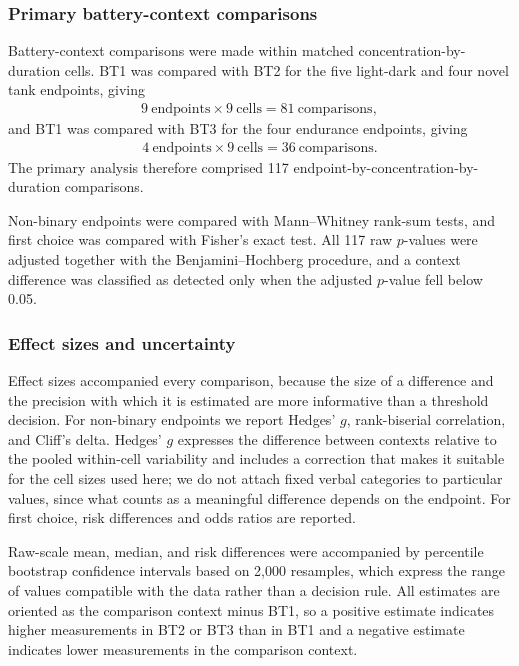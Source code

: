 \documentclass[12pt,a4paper]{article}
\begin{document}
\subsubsection{Primary battery-context comparisons}
\label{sec:context-statistics}
Battery-context comparisons were made within matched concentration-by-duration cells. BT1 was compared with BT2 for the five light-dark and four novel tank endpoints, giving
\begin{equation}
\label{eq:bt1-bt2}
\begin{split}
9\ \mathrm{endpoints} \times 9\ \mathrm{cells} = 81\ \mathrm{comparisons},
\end{split}
\end{equation}
and BT1 was compared with BT3 for the four endurance endpoints, giving
\begin{equation}
\label{eq:bt1-bt3}
\begin{split}
4\ \mathrm{endpoints} \times 9\ \mathrm{cells} = 36\ \mathrm{comparisons}.
\end{split}
\end{equation}
The primary analysis therefore comprised 117 endpoint-by-concentration-by-duration comparisons.

Non-binary endpoints were compared with Mann--Whitney rank-sum tests, and first choice was compared with Fisher's exact test. All 117 raw $p$-values were adjusted together with the Benjamini--Hochberg procedure, and a context difference was classified as detected only when the adjusted $p$-value fell below 0.05.

\subsubsection{Effect sizes and uncertainty}
\label{sec:effect-sizes}
Effect sizes accompanied every comparison, because the size of a difference and the precision with which it is estimated are more informative than a threshold decision. For non-binary endpoints we report Hedges' $g$, rank-biserial correlation, and Cliff's delta. Hedges' $g$ expresses the difference between contexts relative to the pooled within-cell variability and includes a correction that makes it suitable for the cell sizes used here; we do not attach fixed verbal categories to particular values, since what counts as a meaningful difference depends on the endpoint. For first choice, risk differences and odds ratios are reported.

Raw-scale mean, median, and risk differences were accompanied by percentile bootstrap confidence intervals based on 2,000 resamples, which express the range of values compatible with the data rather than a decision rule. All estimates are oriented as the comparison context minus BT1, so a positive estimate indicates higher measurements in BT2 or BT3 than in BT1 and a negative estimate indicates lower measurements in the comparison context.
\end{document}
